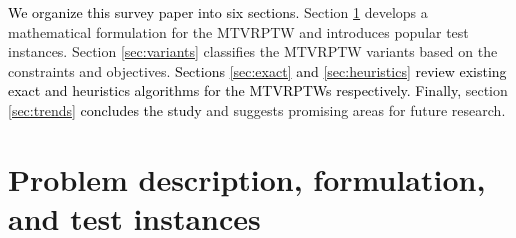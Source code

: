 \documentclass[11pt]{article}
\newcommand\add[1]{\textcolor{black}{#1}}
\begin{document}

\add{We organize this survey paper into six sections.}
Section \ref{sec:formulation} develops a mathematical formulation for the MTVRPTW and introduces popular test instances.  Section \ref{sec:variants} classifies the MTVRPTW variants based on the constraints and objectives.  \add{Sections \ref{sec:exact} and \ref{sec:heuristics} review existing exact and heuristics algorithms for the MTVRPTWs respectively.}%
\add{Finally,} section \ref{sec:trends} \add{concludes the study} and suggests promising areas for future research.

\section{Problem description, formulation, and test instances}
\label{sec:formulation}
\end{document}
